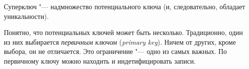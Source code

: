 \begin{Def}
	Суперключ "--- надмножество потенциального ключа (и, следовательно, обладает уникальности).
\end{Def}

Понятно, что потенциальных ключей может быть несколько.
Традиционно, один из них выбирается \textit{первичным ключом} (\textit{primary key}).
Ничем от других, кроме выбора, он не отличается.
Это ограничение "--- одно из самых важных.
По первичному ключу можно находить и индетифицировать записи.

